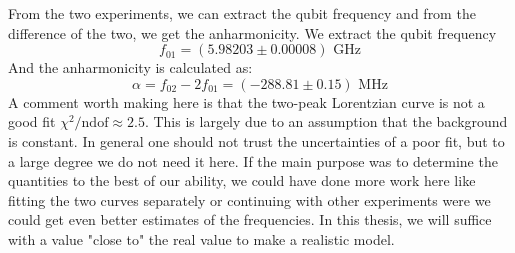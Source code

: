 From the two experiments, we can extract the qubit frequency and from the difference of the two, we get the anharmonicity. We extract the qubit frequency
\begin{equation}
    f_{01} = (5.98203 \pm 0.00008) \text{ GHz}
\end{equation}
And the anharmonicity is calculated as:
\begin{equation}
    \alpha = f_{02} - 2f_{01} = (-288.81 \pm 0.15) \text{ MHz}
\end{equation}
A comment worth making here is that the two-peak Lorentzian curve is not a good fit $\chi^2/\text{ndof} \approx 2.5$. This is largely due to an assumption that the background is constant. In general one should not trust the uncertainties of a poor fit, but to a large degree we do not need it here. If the main purpose was to determine the quantities to the best of our ability, we could have done more work here like fitting the two curves separately or continuing with other experiments were we could get even better estimates of the frequencies. In this thesis, we will suffice with a value "close to" the real value to make a realistic model.


